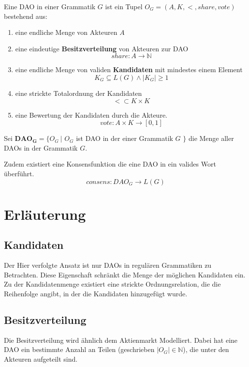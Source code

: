 \documentclass[a4paper,12pt]{report}
\begin{document}
Eine DAO in einer Grammatik $G$ ist ein Tupel $O_G=(A, K, <, share, vote)$ bestehend aus:

\begin{enumerate}
\item eine endliche Menge von Akteuren $A$
\item eine eindeutige \textbf{Besitzverteilung} von Akteuren zur DAO
  \[share: A \rightarrow \mathbb{N}\]
\item eine endliche Menge von validen \textbf{Kandidaten} mit mindestes einem Element 
  \[K_G \subseteq L(G) \land |K_G| \geq 1\] 
\item eine strickte Totalordnung der Kandidaten 
  \[ < \subset K\times K \] 
\item eine Bewertung der Kandidaten durch die Akteure. 
  \[vote: A\times K \rightarrow [0,1]\]
\end{enumerate}

Sei $\mathbf{DAO_G} = \{ O_G\ |$ $O_G$ ist DAO in der einer Grammatik $G$ $\}$ die Menge aller DAOs in der Grammatik $G$.

Zudem existiert eine Konsensfunktion die eine DAO in ein valides Wort überführt. 
  \[consens: DAO_G \rightarrow L(G)\] 


\section{Erläuterung}

\subsection*{Kandidaten}
Der Hier verfolgte Ansatz ist nur DAOs in regulären Grammatiken zu Betrachten. Diese Eigenschaft schränkt die Menge der möglichen Kandidaten ein. Zu der Kandidatenmenge existiert eine strickte Ordnungsrelation, die die Reihenfolge angibt, in der die Kandidaten hinzugefügt wurde.

\subsection*{Besitzverteilung}


Die Besitzverteilung wird ähnlich dem Aktienmarkt Modelliert. Dabei hat eine DAO ein bestimmte Anzahl an Teilen (geschrieben $|O_G| \in \mathbb{N}$), die unter den Akteuren aufgeteilt sind. 
\end{document}
